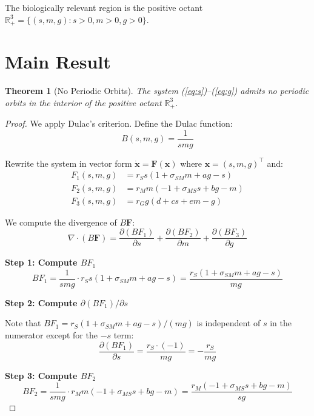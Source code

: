 \documentclass[11pt]{article}
\newtheorem{theorem}{Theorem}
\begin{document}
The biologically relevant region is the positive octant $\mathbb{R}^3_+ = \{(s,m,g) : s > 0, m > 0, g > 0\}$.

\section{Main Result}

\begin{theorem}[No Periodic Orbits]
The system (\ref{eq:s})--(\ref{eq:g}) admits no periodic orbits in the interior of the positive octant $\mathbb{R}^3_+$.
\end{theorem}

\begin{proof}
We apply Dulac's criterion. Define the Dulac function:
\begin{equation}
B(s,m,g) = \frac{1}{smg}
\end{equation}

Rewrite the system in vector form $\dot{\mathbf{x}} = \mathbf{F}(\mathbf{x})$ where $\mathbf{x} = (s,m,g)^\top$ and:
\begin{align}
F_1(s,m,g) &= r_S s(1 + \sigma_{SM} m + a g - s)\\
F_2(s,m,g) &= r_M m(-1 + \sigma_{MS} s + b g - m)\\
F_3(s,m,g) &= r_G g(d + c s + e m - g)
\end{align}

We compute the divergence of $B \mathbf{F}$:
\begin{equation}
\nabla \cdot (B \mathbf{F}) = \frac{\partial (BF_1)}{\partial s} + \frac{\partial (BF_2)}{\partial m} + \frac{\partial (BF_3)}{\partial g}
\end{equation}

\textbf{Step 1: Compute $BF_1$}
\begin{equation}
BF_1 = \frac{1}{smg} \cdot r_S s(1 + \sigma_{SM} m + a g - s) = \frac{r_S(1 + \sigma_{SM} m + a g - s)}{mg}
\end{equation}

\textbf{Step 2: Compute $\partial(BF_1)/\partial s$}

Note that $BF_1 = r_S(1 + \sigma_{SM} m + a g - s)/(mg)$ is independent of $s$ in the numerator except for the $-s$ term:
\begin{equation}
\frac{\partial(BF_1)}{\partial s} = \frac{r_S \cdot (-1)}{mg} = -\frac{r_S}{mg}
\end{equation}

\textbf{Step 3: Compute $BF_2$}
\begin{equation}
BF_2 = \frac{1}{smg} \cdot r_M m(-1 + \sigma_{MS} s + b g - m) = \frac{r_M(-1 + \sigma_{MS} s + b g - m)}{sg}
\end{equation}


\end{proof}
\end{document}
